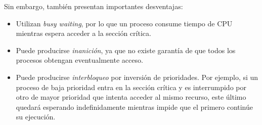 Sin embargo, también presentan importantes desventajas:

\begin{itemize}
    \item Utilizan \textit{busy waiting}, por lo que un proceso consume tiempo de CPU mientras espera acceder a la sección crítica.
    \item Puede producirse \textit{inanición}, ya que no existe garantía de que todos los procesos obtengan eventualmente acceso.
    \item Puede producirse \textit{interbloqueo} por inversión de prioridades. Por ejemplo, si un proceso de baja prioridad entra en la sección crítica y es interrumpido por otro de mayor prioridad que intenta acceder al mismo recurso, este último quedará esperando indefinidamente mientras impide que el primero continúe su ejecución.
\end{itemize}
